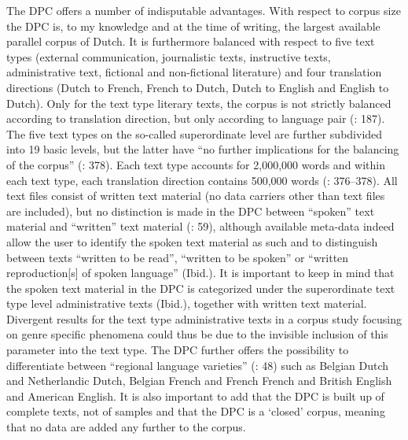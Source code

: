The DPC offers a number of indisputable advantages. With respect to corpus size the DPC is, to my knowledge and at the time of writing, the largest available parallel corpus of Dutch. It is furthermore balanced with respect to five text types (external communication, journalistic texts, instructive texts, administrative text, fictional and non-fictional literature) and four translation directions (Dutch to French, French to Dutch, Dutch to English and English to Dutch). Only for the text type literary texts, the corpus is not strictly balanced according to translation direction, but only according to language pair (\citealt{spyns_dutch_2013}: 187). The five text types on the so-called superordinate level are further subdivided into 19 basic levels, but the latter have “no further implications for the balancing of the corpus” (\citealt{macken_dutch_2011}: 378). Each text type accounts for 2,000,000 words and within each text type, each translation direction contains 500,000 words (\citealt{macken_dutch_2011}: 376–378). All text files consist of written text material (no data carriers other than text files are included), but no distinction is made in the DPC between “spoken” text material and “written” text material (\citealt{delaere_translations_2015}: 59), although available meta-data indeed allow the user to identify the spoken text material as such and to distinguish between texts “written to be read”, “written to be spoken” or  “written reproduction[s] of spoken language” (Ibid.). It is important to keep in mind that the spoken text material in the DPC is categorized under the superordinate text type level administrative texts (Ibid.), together with written text material. Divergent results for the text type administrative texts in a corpus study focusing on genre specific phenomena could thus be due to the invisible inclusion of this parameter into the text type. The DPC further offers the possibility to differentiate between “regional language varieties” (\citealt{delaere_translations_2015}: 48) such as Belgian Dutch and Netherlandic Dutch, Belgian French and French French and British English and American English. It is also important to add that the DPC is built up of complete texts, not of samples and that the DPC is a ‘closed’ corpus, meaning that no data are added any further to the corpus.



